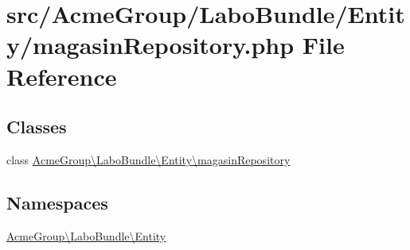 \hypertarget{magasin_repository_8php}{\section{src/\+Acme\+Group/\+Labo\+Bundle/\+Entity/magasin\+Repository.php File Reference}
\label{magasin_repository_8php}
}
\subsection*{Classes}
\begin{DoxyCompactItemize}
\item 
class \hyperlink{class_acme_group_1_1_labo_bundle_1_1_entity_1_1magasin_repository}{Acme\+Group\textbackslash{}\+Labo\+Bundle\textbackslash{}\+Entity\textbackslash{}magasin\+Repository}
\end{DoxyCompactItemize}
\subsection*{Namespaces}
\begin{DoxyCompactItemize}
\item 
 \hyperlink{namespace_acme_group_1_1_labo_bundle_1_1_entity}{Acme\+Group\textbackslash{}\+Labo\+Bundle\textbackslash{}\+Entity}
\end{DoxyCompactItemize}
